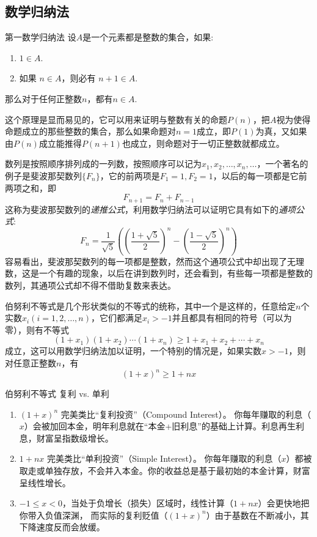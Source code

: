 \subsection{数学归纳法}

\begin{myprinciple}{第一数学归纳法}{}{\label{thm:mathematical-induction}}
  设$A$是一个元素都是整数的集合，如果:
  \begin{enumerate}
  \item $1 \in A$.
  \item 如果 $n \in A$，则必有 $ n+1 \in A$.
  \end{enumerate}
  那么对于任何正整数$n$，都有$n \in A$.
\end{myprinciple}

这个原理是显而易见的，它可以用来证明与整数有关的命题$P(n)$，把$A$视为使得命题成立的那些整数的集合，那么如果命题对$n=1$成立，即$P(1)$为真，又如果由$P(n)$成立能推得$P(n+1)$也成立，则命题对于一切正整数就都成立。

\begin{example}
  数列是按照顺序排列成的一列数，按照顺序可以记为$x_1,x_2,\ldots,x_n,\ldots$，一个著名的例子是斐波那契数列$\{F_n\}$，它的前两项是$F_1=1,F_2=1$，以后的每一项都是它前两项之和，即
  \[ F_{n+1}=F_n+F_{n-1} \]
  这称为斐波那契数列的\emph{递推公式}，利用数学归纳法可以证明它具有如下的\emph{通项公式}:
  \[ F_n = \frac{1}{\sqrt{5}} \left( \left( \frac{1+\sqrt{5}}{2} \right)^n - \left( \frac{1-\sqrt{5}}{2} \right)^n \right) \]
  容易看出，斐波那契数列的每一项都是整数，然而这个通项公式中却出现了无理数，这是一个有趣的现象，以后在讲到数列时，还会看到，有些每一项都是整数的数列，其通项公式却不得不借助复数来表达。
\end{example}

\begin{example}
  伯努利不等式是几个形状类似的不等式的统称，其中一个是这样的，任意给定$n$个实数$x_i(i=1,2,\ldots,n)$，它们都满足$x_i>-1$并且都具有相同的符号（可以为零），则有不等式
  \[ (1+x_1)(1+x_2)\cdots(1+x_n) \geqslant 1+x_1+x_2+\cdots+x_n \]
  成立，这可以用数学归纳法加以证明，一个特别的情况是，如果实数$x>-1$，则对任意正整数$n$，有
  \[ (1+x)^n \geqslant 1+nx \]
\end{example}
\begin{coreidea}{伯努利不等式}
  复利 vs. 单利
  \begin{enumerate}
    \item \((1+x)^{n}\) 完美类比“复利投资”（Compound Interest）。
      你每年赚取的利息（\(x\)）会被加回本金，明年利息就在“本金+旧利息”的基础上计算。利息再生利息，财富呈指数级增长。
    \item \(1+nx\) 完美类比“单利投资”（Simple Interest）。
      你每年赚取的利息（\(x\)）都被取走或单独存放，不会并入本金。你的收益总是基于最初始的本金计算，财富呈线性增长。 
    \item \( -1 \le x < 0\)，当处于负增长（损失）区域时，线性计算（\(1+nx\)）会更快地把你带入负值深渊，
      而实际的复利贬值（\((1+x)^{n}\)）由于基数在不断减小，其下降速度反而会放缓。
  \end{enumerate} 
\end{coreidea}

